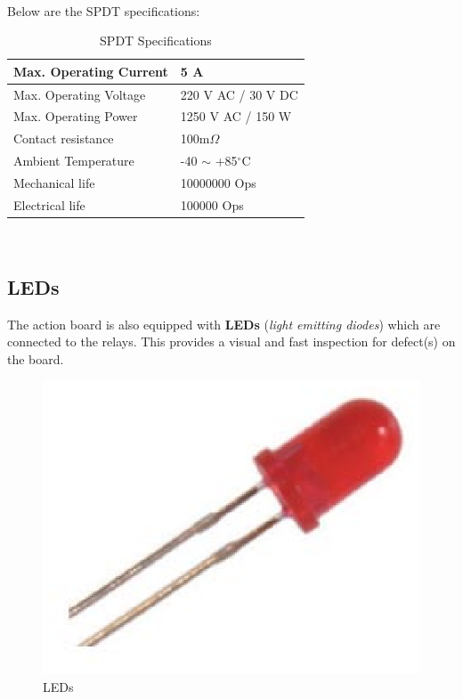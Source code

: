 \documentclass[12pt,a4paper,draft]{report}
\begin{document}
\ \\
Below are the SPDT specifications:
\begin{table}[h]
\centering
    \begin{tabular}{|l|l|}
    \hline Max. Operating Current & 5 A \\
    \hline Max. Operating Voltage & 220 V AC / 30 V DC \\
    \hline Max. Operating Power & 1250 V AC / 150 W \\
    \hline Contact resistance & 100m$\Omega$ \\
    \hline Ambient Temperature & -40 $\sim$ +85$^\circ$C \\
    \hline Mechanical life & 10000000 Ops \\
    \hline Electrical life & 100000 Ops \\
    \hline
    \end{tabular}
    \caption{SPDT Specifications}
\end{table}
\ \\
\subsection{LEDs}
The action board is also equipped with \textbf{LEDs} (\textit{light emitting diodes}) which are connected to the relays. This provides a visual and fast inspection for defect(s) on the board.
\begin{figure}[H]
\centering
    \includegraphics*[scale=0.2]{led}
    \caption{LEDs}
\end{figure}
\ \\
%
\end{document}
